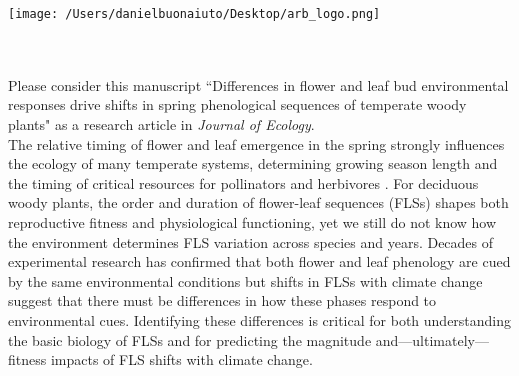 \documentclass[11.75 pt]{article}\usepackage[]{graphicx}\usepackage[]{color}
\begin{document}

\def\labelitemi{--}
\parindent=24pt
\noindent\texttt{[image: /Users/danielbuonaiuto/Desktop/arb\_logo.png]}
\\\\
\\
\vspace{1.5ex}

\noindent Please consider this manuscript ``Differences in flower and leaf bud environmental responses drive shifts in spring phenological sequences of temperate woody plants" as a research article in \textit{Journal of Ecology}.\\

\noindent The relative timing of flower and leaf emergence in the spring strongly influences the ecology of many temperate systems, determining growing season length and the timing of critical resources for pollinators and herbivores \citep{Li2016}. For deciduous woody plants, the order and duration of flower-leaf sequences (FLSs) shapes both reproductive fitness and physiological functioning, yet we still do not know how the environment determines FLS variation across species and years. Decades of experimental research has confirmed that both flower and leaf phenology are cued by the same environmental conditions \citep{Korner:2010aa} but shifts in FLSs with climate change suggest that there must be differences in how these phases respond to environmental cues. Identifying these differences is critical for both understanding the basic biology of FLSs and for predicting the magnitude and---ultimately---fitness impacts of FLS shifts with climate change.\\
\end{document}
